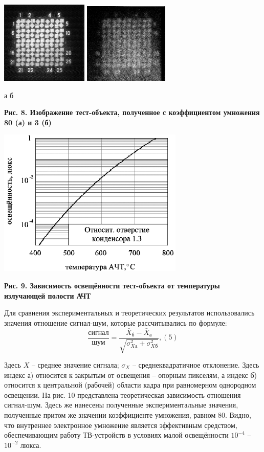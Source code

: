 \documentclass[11pt]{article}
\begin{document}
\includegraphics[width=0.249\linewidth]{12.png}
\includegraphics[width=0.25\linewidth]{13.png}

\qquad  \qquad  а  \qquad  \qquad \qquad  \qquad \quad б  \qquad  \qquad  \qquad  \qquad  
\begin{center}
\textbf{Рис. 8. Изображение тест-объекта, полученное с коэффициентом умножения 80 (а) и 3 (б)}
\end{center}

\includegraphics[width=0.8\linewidth]{14.png}
\begin{center}
\textbf{Рис. 9. Зависимость освещённости тест-объекта от температуры излучающей полости АЧТ}
\end{center}

Для сравнения экспериментальных и теоретических результатов использовались значения отношение сигнал-шум, которые рассчитывались по формуле:
$$\frac{\text{сигнал}}{\text{шум}} = \frac{\bar X_\textit{б} - \bar X_\textit{а}}{\sqrt{\sigma^2_X_\textit{а}+\sigma^2_X_\textit{б}}} , (5)$$

Здесь $X$ – среднее значение сигнала; $\sigma_X$ – среднеквадратичное отклонение. Здесь индекс а) относится к закрытым от освещения – опорным пикселям, а индекс б) относится к центральной (рабочей) области кадра при равномерном однородном освещении. На рис. 10 представлена теоретическая зависимость отношения сигнал-шум. Здесь же нанесены полученные экспериментальные значения, полученные притом же значении коэффициенте умножения, равном 80. Видно, что внутреннее электронное умножение является эффективным средством, обеспечивающим работу ТВ-устройств в условиях малой освещённости $10^{-4}$ – $10^{-2}$ люкса.
\end{document}
